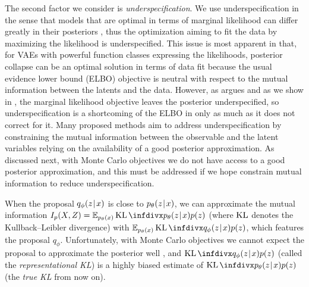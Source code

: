 The second factor we consider is \emph{underspecification}.
We use underspecification in the sense that models that are optimal in terms of marginal likelihood can differ greatly in their posteriors \citep{huszar2017representation}, thus the optimization aiming to fit the data by maximizing the likelihood is underspecified.
This issue is most apparent in that, for VAEs with powerful function classes expressing the likelihoods, posterior collapse can be an optimal solution in terms of data fit because the usual evidence lower bound (ELBO) objective is neutral with respect to the mutual information between the latents and the data.
However, as \citet{huszar2017representation} argues and as we show in , the marginal likelihood objective leaves the posterior underspecified, so underspecification is a shortcoming of the ELBO in only as much as it does not correct for it.
Many proposed methods aim to address underspecification by constraining the mutual information between the observable and the latent variables \citep{higgins2016beta,phuong2018mutual,zhao2019infovae} relying on the availability of a good posterior approximation.
As discussed next, with Monte Carlo objectives we do not have access to a good posterior approximation, and this must be addressed if we hope constrain mutual information to reduce underspecification.

When the proposal $q_\phi(z\hspace{0.08em}|\hspace{0.11em} x)$ is close to $p_\theta(z\hspace{0.08em}|\hspace{0.11em} x)$, we can approximate the mutual information $I_p(X,Z) = \E_{p_\theta(x)}\KL\Div{p_\theta(z\tmid x)}{p(z)}$
(where $\operatorname{KL}$ denotes the Kullback--Leibler divergence) with $\E_{p_\theta(x)}\KL\Div{q_\phi(z\tmid x)}{p(z)}$, which features the proposal $q_\phi$.
Unfortunately, with Monte Carlo objectives we cannot expect the proposal to approximate the posterior well \citep{mnih2016variational}, and $\KL\Div{q_\phi(z\tmid x)}{p(z)}$ (called the \emph{representational KL}) is a highly biased estimate of $\KL\Div{p_\theta(z\tmid x)}{p(z)}$ (the \emph{true KL} from now on).

